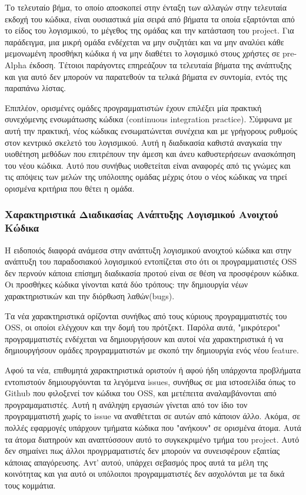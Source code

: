 \documentclass[a4paper, 11pt]{article}
\begin{document}
{{Το τελευταίο βήμα, το οποίο αποσκοπεί στην ένταξη των αλλαγών στην τελευταία εκδοχή του κώδικα, είναι ουσιαστικά μία σειρά από βήματα τα οποία εξαρτόνται από το είδος του λογισμικού, το μέγεθος της ομάδας και την κατάσταση του \textlatin{project}. Για παράδειγμα, μια μικρή ομάδα ενδέχεται να μην συζητάει και να μην αναλύει κάθε μεμονωμένη προσθήκη κώδικα ή να μην διαθέτει το λογισμικό στους χρήστες σε \textlatin{pre-Alpha} έκδοση. Τέτοιοι παράγοντες επηρεάζουν τα τελευταία βήματα της ανάπτυξης και για αυτό δεν μπορούν να παρατεθούν τα τελικά βήματα εν συντομία, εντός της παραπάνω λίστας.

Επιπλέον, ορισμένες ομάδες προγραμματιστών έχουν επιλέξει μία πρακτική συνεχόμενης ενσωμάτωσης κώδικα (\textlatin{continuous integration practice}). Σύμφωνα με αυτή την πρακτική, νέος κώδικας ενσωματώνεται συνέχεια και με γρήγορους ρυθμούς στον κεντρικό σκελετό του λογισμικού. Αυτή η διαδικασία καθιστά αναγκαία την υιοθέτηση μεθόδων που επιτρέπουν την άμεση και άνευ καθυστερήσεων ανασκόπηση του νέου κώδικα. Αυτό που συνήθως υιοθετείται είναι αναφορές από τις γνώμες και τις απόψεις των μελών της υπόλοιπης ομάδας μέχρις ότου ο νέος κώδικας να τηρεί ορισμένα κριτήρια που θέτει η ομάδα.

\subsubsection{Χαρακτηριστικά Διαδικασίας Ανάπτυξης Λογισμικού Ανοιχτού Κώδικα}

Η ειδοποιός διαφορά ανάμεσα στην ανάπτυξη λογισμικού ανοιχτού κώδικα και στην ανάπτυξη του παραδοσιακού λογισμικού εντοπίζεται στο ότι οι προγραμματιστές \textlatin{OSS} δεν περνούν κάποια επίσημη διαδικασία προτού είναι σε θέση να προσφέρουν κώδικα. Οι προσθήκες κώδικα γίνονται κατά δύο τρόπους: την δημιουργία νέων χαρακτηριστικών και την διόρθωση λαθών(\textlatin{bugs}).

Τα νέα χαρακτηριστικά ορίζονται συνήθως από τους κύριους προγραμματιστές του \textlatin{OSS}, οι οποίοι ελέγχουν και την δομή του πρότζεκτ. Παρόλα αυτά, "μικρότεροι" προγραμματιστές ενδέχεται να δημιουργήσουν και αυτοί νέα χαρακτηριστικά ή να δημιουργήσουν ομάδες προγραμματιστών με σκοπό την δημιουργία ενός νέου \textlatin{feature}.

Αφού τα νέα, επιθυμητά χαρακτηριστικά οριστούν ή αφού ήδη υπάρχοντα προβλήματα εντοπιστούν δημιουργόυνται τα λεγόμενα \textlatin{issues}, συνήθως σε μια ιστοσελίδα όπως το \textlatin{Github} που φιλοξενεί τον κώδικα του \textlatin{OSS}, και μετέπειτα αναλαμβάνονται από προγραμαματιστές. Αυτή η ανάληψη εργασιών γίνεται από τον ίδιο τον προγραμματιστή χωρίς το \textlatin{issue} να αναθέτεται σε αυτών από κάποιον άλλο. Ακόμα, σε πολλές εφαρμογές υπάρχουν τμήματα κώδικα που "ανήκουν" σε ορισμένα άτομα. Αυτά τα άτομα διατηρούν και αναπτύσσουν αυτό το συγκεκριμένο τμήμα του \textlatin{project}. Αυτό δεν σημαίνει πως άλλοι προγρμαματιστές δεν μπορούν να συνεισφέρουν εξαιτίας κάποιας απαγόρευσης. Αντ' αυτού, υπάρχει σεβασμός προς αυτά τα μέλη της κοινότητας και για αυτό οι υπόλοιποι προγραμματιστές δεν ασχολόνται με τα δικά τους κομμάτια.

}}
\end{document}
